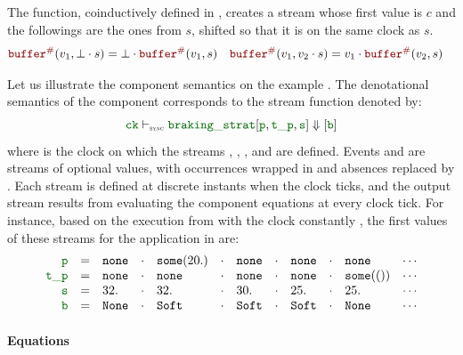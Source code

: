 The  function, coinductively defined in ,
creates a stream whose first value is $c$ and the followings are the ones from $s$, shifted so that
it is on the same clock as $s$.
\begin{align}
    \buffer{v_1}{\bot \step s} & = \bot \step \buffer{v_1}{s} &
    \buffer{v_1}{v_2 \step s}  & = v_1 \step \buffer{v_2}{s}
    \label{eq:semantics:grsync:denot:aux:buffer}
\end{align}

Let us illustrate the component semantics on the example .
The denotational semantics of the component  corresponds to the stream function
denoted by:
\begin{equation*}
    \idf{ck} \vdashSync \idf{braking\_strat}[\idf{p}, \idf{t\_p}, \idf{s}] \Downarrow [\idf{b}]
\end{equation*}
where  is the clock on which the streams , , , and  are
defined. Events  and  are streams of optional values, with occurrences wrapped in
 and absences replaced by \none. Each stream is defined at discrete instants when the
clock ticks, and the output stream  results from evaluating the component equations at
every clock tick.
%
For instance, based on the execution from  with the clock
 constantly \true, the first values of these streams for the application in
 are:%
\setlength{\arraycolsep}{2pt}%
\begin{equation*}
    \begin{array}{rrlllllllllll}
        \idf{p}    & = & \none & \step & \some{20.} & \step & \none & \step & \none & \step & \none     & \cdots \\
        \idf{t\_p} & = & \none & \step & \none      & \step & \none & \step & \none & \step & \some{()} & \cdots \\
        \idf{s}    & = & 32.   & \step & 32.        & \step & 30.   & \step & 25.   & \step & 25.       & \cdots \\
        \idf{b}    & = & \No   & \step & \Soft      & \step & \Soft & \step & \Soft & \step & \No       & \cdots
    \end{array}
\end{equation*}%
\setlength{\arraycolsep}{5pt}%

\paragraph{Equations}

